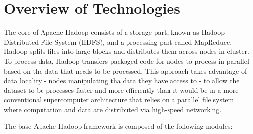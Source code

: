 \documentclass[conference]{IEEEtran}
\begin{document}
\section{Overview of Technologies}
The core of Apache Hadoop consists of a storage part, known as Hadoop Distributed File System (HDFS), and a processing part called MapReduce. Hadoop splits files into large blocks and distributes them across nodes in cluster. To process data, Hadoop transfers packaged code for nodes to process in parallel
based on the data that needs to be processed. This approach takes advantage of data locality - nodes manipulating tha data they have access to - to allow the dataset to be processes faster and more efficiently than it would be in a more conventional supercomputer architecture that relies on a parallel file 
system where computation and data are distributed via high-speed networking.
\par The base Apache Hadoop framework is composed of the following modules:
\end{document}
